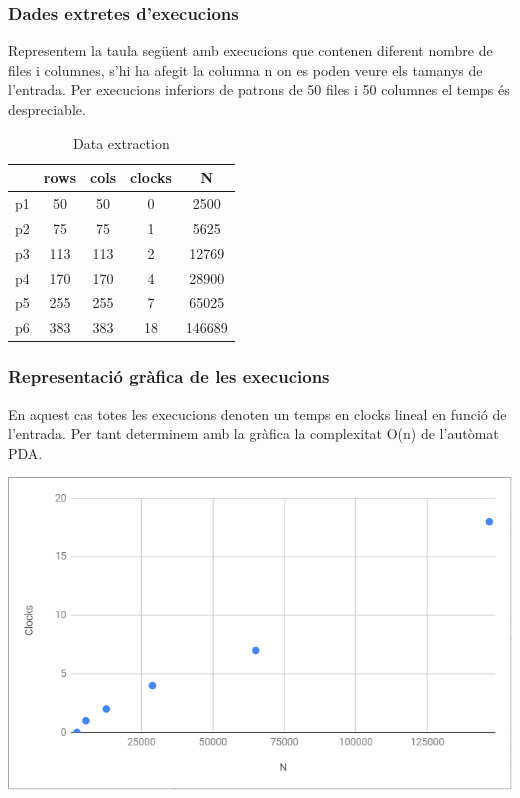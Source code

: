 \documentclass[12pt,a4paper]{report}
\begin{document}
\subsubsection{Dades extretes d'execucions}

Representem la taula següent amb execucions que contenen diferent nombre de files i columnes, s'hi ha afegit la columna n on es poden veure els tamanys de l'entrada. Per execucions inferiors de patrons de 50 files i 50 columnes el temps és despreciable. 

\begin{center}
\begin{table}[ht]
\caption{\label{tab:table-name} Data extraction}
\centering
\begin{tabular}{ccccc}
\hline
\hline
   & rows & cols & clocks & N      \\ \hline
p1 & 50   & 50   & 0      & 2500   \\ \hline
p2 & 75   & 75   & 1      & 5625   \\ \hline
p3 & 113  & 113  & 2      & 12769  \\ \hline
p4 & 170  & 170  & 4      & 28900  \\ \hline
p5 & 255  & 255  & 7      & 65025  \\ \hline
p6 & 383  & 383  & 18     & 146689 \\ \hline
\hline
\hline
\end{tabular}
\end{table}
\end{center}

\subsubsection{Representació gràfica de les execucions}

En aquest cas totes les execucions denoten un temps en clocks lineal en funció de l'entrada. Per tant determinem amb la gràfica la complexitat O(n) de l'autòmat PDA.

\begin{center}
\includegraphics[width=16cm]{complexdfa}
\end{center}
\end{document}
